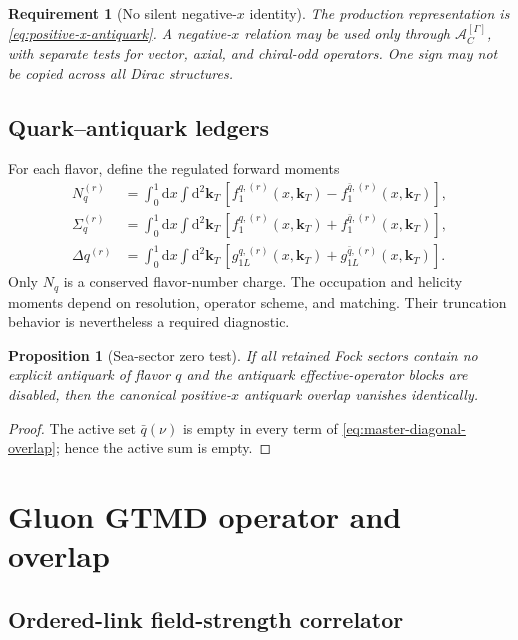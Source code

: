 \documentclass[11pt]{article}
\newtheorem{requirement}[definition]{Requirement}
\newtheorem{proposition}[definition]{Proposition}
\newcommand{\kT}{\bm{k}_{T}}
\newcommand{\dd}{\mathrm{d}}
\newcommand{\cA}{\mathcal A}
\begin{document}
\begin{requirement}[No silent negative-\(x\) identity]
\label{req:no-silent-negative-x}
The production representation is \cref{eq:positive-x-antiquark}.  A
negative-\(x\) relation may be used only through
\(\cA_C^{[\Gamma]}\), with separate tests for vector, axial, and chiral-odd
operators.  One sign may not be copied across all Dirac structures.
\end{requirement}

\subsection{Quark--antiquark ledgers}

For each flavor, define the regulated forward moments
\begin{align}
 N_q^{(r)}&=\int_0^1\dd x\int\dd^2\kT\,
 \left[f_1^{q,(r)}(x,\kT)-f_1^{\bar q,(r)}(x,\kT)\right],
\label{eq:net-flavor-number}\\
 \Sigma_q^{(r)}&=\int_0^1\dd x\int\dd^2\kT\,
 \left[f_1^{q,(r)}(x,\kT)+f_1^{\bar q,(r)}(x,\kT)\right],
\label{eq:total-flavor-occupation}\\
 \Delta q^{(r)}&=\int_0^1\dd x\int\dd^2\kT\,
 \left[g_{1L}^{q,(r)}(x,\kT)+g_{1L}^{\bar q,(r)}(x,\kT)\right].
\label{eq:flavor-helicity-ledger}
\end{align}
Only \(N_q\) is a conserved flavor-number charge.  The occupation and
helicity moments depend on resolution, operator scheme, and matching.  Their
truncation behavior is nevertheless a required diagnostic.

\begin{proposition}[Sea-sector zero test]
\label{prop:sea-zero-test}
If all retained Fock sectors contain no explicit antiquark of flavor \(q\)
and the antiquark effective-operator blocks are disabled, then the canonical
positive-\(x\) antiquark overlap vanishes identically.
\end{proposition}

\begin{proof}
The active set \(\bar q(\nu)\) is empty in every term of
\cref{eq:master-diagonal-overlap}; hence the active sum is empty.
\end{proof}

\section{Gluon GTMD operator and overlap}
\label{sec:gluon}

\subsection{Ordered-link field-strength correlator}
\end{document}
